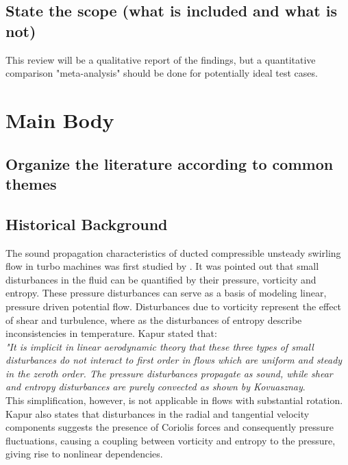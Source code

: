 \documentclass[conf]{new-aiaa}
\begin{document}
\subsection{State the scope (what is included and what is not)}
This review will be a qualitative report of the findings, but a quantitative comparison "meta-analysis" should be done for potentially ideal test cases.
\section{Main Body}
\subsection*{Organize the literature according to common themes}  

\subsection{Historical Background}
The sound propagation characteristics of ducted compressible unsteady swirling flow in turbo machines was first studied by \cite{kapur1973sound}. It was pointed out that small disturbances in the fluid can be quantified by their pressure, vorticity and entropy. These pressure disturbances can serve as a basis of modeling linear, pressure driven potential flow. Disturbances due to vorticity represent the effect of shear and turbulence, where as the disturbances of entropy describe inconsistencies in temperature. Kapur stated that: \\ 

 \textit{"It is implicit in linear aerodynamic theory that these three types of small disturbances do not interact to first order in flows which are uniform and steady in the zeroth order. The pressure disturbances propagate as sound, while shear and entropy disturbances are purely convected as shown by Kovuasznay}. \\
 
 This simplification, however, is not applicable in flows with substantial rotation. Kapur also states that disturbances in the radial and tangential velocity components suggests the presence of Coriolis forces and consequently pressure fluctuations, causing a coupling between vorticity and entropy to the pressure, giving rise to nonlinear dependencies. 
 
\end{document}
